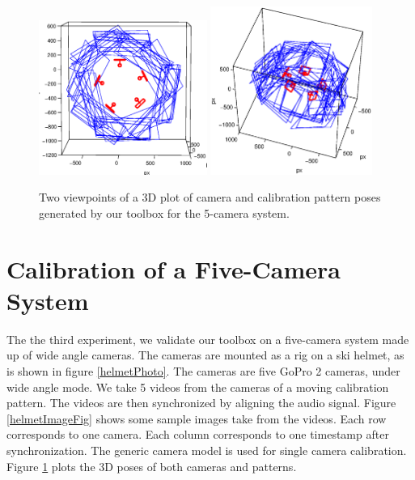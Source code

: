 \documentclass{report}
\begin{document}
\begin{figure}
\centering 
\includegraphics[trim=0in 0in 0in 0.4in, clip=true, width=0.49\textwidth]{images/5rig1} 
\includegraphics[width=0.47\textwidth]{images/5rig2} 
\caption{Two viewpoints of a 3D plot of camera and calibration pattern poses generated by our toolbox for the 5-camera system. } 
\label{fiveCameraRigPlot}
\end{figure}

\section{Calibration of a Five-Camera System}
The the third experiment, we validate our toolbox on a five-camera system made up of wide angle cameras. The cameras are mounted as a rig on a ski helmet, as is shown in figure \ref{helmetPhoto}. The cameras are five GoPro 2 cameras, under wide angle mode. We take 5 videos from the cameras of a moving calibration pattern. The videos are then synchronized by aligning the audio signal. Figure \ref{helmetImageFig} shows some sample images take from the videos. Each row corresponds to one camera. Each column corresponds to one timestamp after synchronization. The generic camera model is used for single camera calibration. Figure \ref{fiveCameraRigPlot} plots the 3D poses of both cameras and patterns. 
\end{document}
